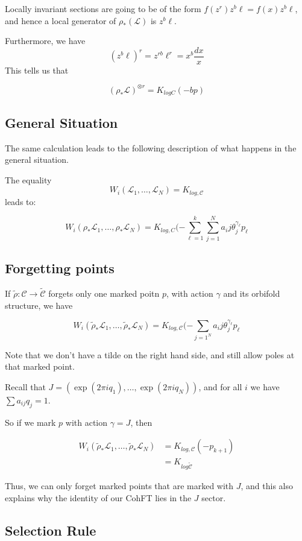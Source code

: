 \documentclass{amsart}
\theoremstyle{definition}
\begin{document}
Locally invariant sections are going to be of the form $f(z^r)z^b\ell=f(x)z^b\ell$, and hence a local generator of $\rho_*(\mathcal{L})$ is $z^b\ell$.

Furthermore, we have $$(z^b\ell)^r=z^{rb}\ell^r=x^b\frac{dx}{x}$$
This tells us that

$$(\rho_*\mathcal{L})^{\otimes r}=K_{log C}(-bp)$$

\subsection{General Situation}

The same calculation leads to the following description of what happens in the general situation.

The equality 
$$W_i(\mathcal{L}_1,\dots,\mathcal{L}_N)=K_{log, \mathcal{C}}$$
leads to:

$$W_i(\rho_*\mathcal{L}_1,\dots,\rho_*\mathcal{L}_N)=K_{log, C}(-\sum_{\ell=1}^k\sum_{j=1}^N a_ij\theta_j^{\gamma_\ell}p_\ell$$


\subsection{Forgetting points}

If $\tilde{\rho}:\mathcal{C}\to\tilde{\mathcal{C}}$ forgets only one marked poitn $p$, with action $\gamma$ and its orbifold structure, we have

$$W_i(\tilde{\rho}_*\mathcal{L}_1,\dots,\tilde{\rho}_*\mathcal{L}_N)=K_{log, \mathcal{C}}(-\sum_{j=1^N} a_ij\theta_j^{\gamma_\ell}p_\ell$$

Note that we don't have a tilde on the right hand side, and still allow poles at that marked point.

Recall that $J=(\exp(2\pi i q_1),\dots,\exp(2\pi i q_N))$, and for all $i$ we have $\sum a_{ij} q_j=1$.

So if we mark $p$ with action $\gamma=J$, then

\begin{align*}
W_i(\tilde{\rho}_*\mathcal{L}_1,\dots,\tilde{\rho}_*\mathcal{L}_N)&=K_{log, \mathcal{C}}(-p_{k+1}) \\
&=K_{log \tilde{\mathcal{C}}}
\end{align*}

Thus, we can only forget marked points that are marked with $J$, and this also explains why the identity of our CohFT lies in the $J$ sector.

\subsection{Selection Rule}
\end{document}
